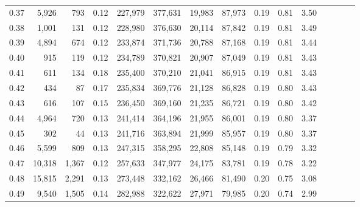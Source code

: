 \begin{tabular}{rrrcrrrrrrrrrrr}
0.37 &   5,926 &     793 &                                       0.12 &  227,979 &  377,631 &   19,983 &   87,973 &  0.19 &  0.81 &                         3.50 \\
0.38 &   1,001 &     131 &                                       0.12 &  228,980 &  376,630 &   20,114 &   87,842 &  0.19 &  0.81 &                         3.49 \\
0.39 &   4,894 &     674 &                                       0.12 &  233,874 &  371,736 &   20,788 &   87,168 &  0.19 &  0.81 &                         3.44 \\
0.40 &     915 &     119 &                                       0.12 &  234,789 &  370,821 &   20,907 &   87,049 &  0.19 &  0.81 &                         3.43 \\
0.41 &     611 &     134 &                                       0.18 &  235,400 &  370,210 &   21,041 &   86,915 &  0.19 &  0.81 &                         3.43 \\
0.42 &     434 &      87 &                                       0.17 &  235,834 &  369,776 &   21,128 &   86,828 &  0.19 &  0.80 &                         3.43 \\
0.43 &     616 &     107 &                                       0.15 &  236,450 &  369,160 &   21,235 &   86,721 &  0.19 &  0.80 &                         3.42 \\
0.44 &   4,964 &     720 &                                       0.13 &  241,414 &  364,196 &   21,955 &   86,001 &  0.19 &  0.80 &                         3.37 \\
0.45 &     302 &      44 &                                       0.13 &  241,716 &  363,894 &   21,999 &   85,957 &  0.19 &  0.80 &                         3.37 \\
0.46 &   5,599 &     809 &                                       0.13 &  247,315 &  358,295 &   22,808 &   85,148 &  0.19 &  0.79 &                         3.32 \\
0.47 &  10,318 &   1,367 &                                       0.12 &  257,633 &  347,977 &   24,175 &   83,781 &  0.19 &  0.78 &                         3.22 \\
0.48 &  15,815 &   2,291 &                                       0.13 &  273,448 &  332,162 &   26,466 &   81,490 &  0.20 &  0.75 &                         3.08 \\
0.49 &   9,540 &   1,505 &                                       0.14 &  282,988 &  322,622 &   27,971 &   79,985 &  0.20 &  0.74 &                         2.99 \\

\end{tabular}
